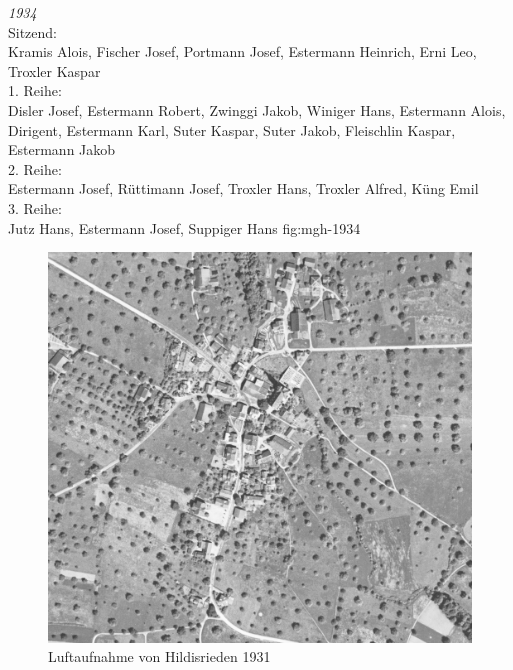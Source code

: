 {\emph{1934}\\
    Sitzend:\\
    Kramis Alois, Fischer Josef, Portmann Josef, Estermann Heinrich, Erni Leo,
    Troxler Kaspar\\
    1. Reihe:\\
    Disler Josef, Estermann Robert, Zwinggi Jakob, Winiger Hans, Estermann
    Alois, Dirigent, Estermann Karl, Suter Kaspar, Suter Jakob, Fleischlin
    Kaspar, Estermann Jakob\\
    2. Reihe:\\
    Estermann Josef, Rüttimann Josef, Troxler Hans, Troxler Alfred, Küng Emil\\
    3. Reihe:\\
    Jutz Hans, Estermann Josef, Suppiger Hans }
{fig:mgh-1934}

\begin{figure}[!htbp]
    \centering
    \includegraphics[height=\textheight,keepaspectratio]{./Dorf-Bilder/Luftaufnahme-1931.jpg}
    \caption{Luftaufnahme von Hildisrieden 1931}
\end{figure}

